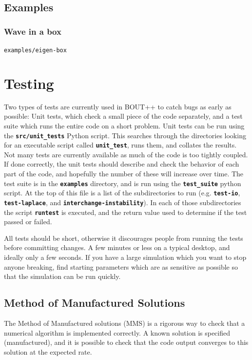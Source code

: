 \documentclass[12pt]{article}
\newcommand{\file}[1]{\texttt{\bf #1}}
\begin{document}
\subsection{Examples}

\subsubsection{Wave in a box}

\texttt{examples/eigen-box}



\section{Testing}
%
Two types of tests are currently used in BOUT++ to catch bugs as early as
possible: Unit tests, which check a small piece of the code separately, and a
test suite which runs the entire code on a short problem.
%
%
Unit tests can be run using the \file{src/unit\_tests} Python script. This
searches through the directories looking for an executable script called
\file{unit\_test}, runs them, and collates the results. Not many tests are
currently available as much of the code is too tightly coupled. If done
correctly, the unit tests should describe and check the behavior of each part
of the code, and hopefully the number of these will increase over time.
%
%
The test suite is in the \file{examples} directory, and is run using the
\file{test\_suite} python script. At the top of this file is a list of the
subdirectories to run (e.g. \file{test-io}, \file{test-laplace}, and
\file{interchange-instability}). In each of those subdirectories the script
\file{runtest} is executed, and the return value used to determine if the test
passed or failed.

All tests should be short, otherwise it discourages people from running the
tests before committing changes. A few minutes or less on a typical desktop,
and ideally only a few seconds. If you have a large simulation which you want
to stop anyone breaking, find starting parameters which are as sensitive as
possible so that the simulation can be run quickly.

\subsection{Method of Manufactured Solutions}
%
The Method of Manufactured solutions (MMS) is a rigorous way to check that a
numerical algorithm is implemented correctly. A known solution is specified
(manufactured), and it is possible to check that the code output converges to
this solution at the expected rate.
\end{document}
